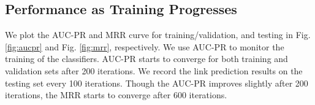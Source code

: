 \documentclass{article}
\begin{document}
{
\color{black}
\subsection{Performance as Training Progresses}

We plot the AUC-PR and MRR curve for training/validation, and testing in Fig. \ref{fig:aucpr} and 
Fig. \ref{fig:mrr}, respectively. We use AUC-PR to monitor the training of the classifiers. AUC-PR
starts to converge for both training and validation sets after 200 iterations. We record the 
link prediction results on the testing set every 100 iterations. Though the AUC-PR improves slightly
after 200 iterations, the MRR starts to converge after 600 iterations.
}
\end{document}
